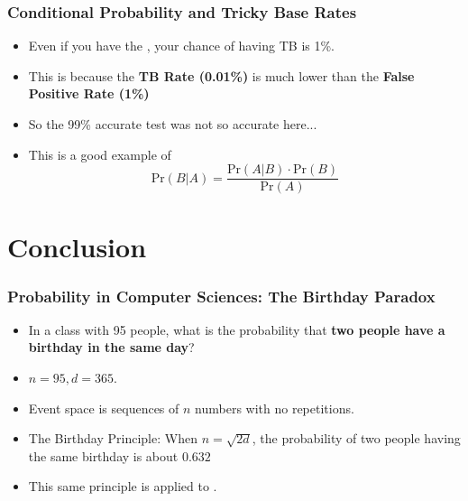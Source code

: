 \documentclass{beamer}
\begin{document}
\begin{frame}
  \frametitle{Conditional Probability and Tricky Base Rates}

  {\large
    \begin{itemize}
    \item Even if you have the , your chance of having TB is 1\%.
      \bigskip

    \item This is because the {\bf TB Rate (0.01\%)} is much lower
      than the {\bf False Positive Rate (1\%)}
      \bigskip

    \item So the 99\% accurate test was not so accurate here...
      \vfill

    \item This is a good example of {\bf {}}
      \begin{equation*}
        \text{Pr}(B|A) = \frac{\text{Pr}(A|B)\cdot\text{Pr}(B)}{\text{Pr}(A)}
      \end{equation*}
      
    \end{itemize}

  }
\end{frame}


\section{Conclusion}

\begin{frame}
  \frametitle{Probability in Computer Sciences: The Birthday Paradox}

  {\large
    \begin{itemize}
    \item In a class with 95 people, what is the probability that {\bf two
      people have a birthday in the same day}?
      \bigskip

    \item <2-> $n = 95, d = 365$.
    \item <2-> Event space is sequences of $n$ numbers with no repetitions.
      \bigskip

    \item <3-> \alert{The Birthday Principle}: When $n = \sqrt{2d}$,
      the probability of two people having the same birthday is about
      $0.632$
    \item <3-> This same principle is applied to .
    \end{itemize}
  }
\end{frame}
\end{document}
